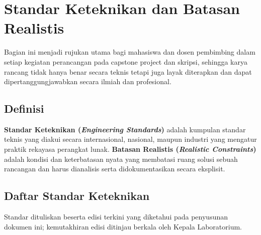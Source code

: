 \documentclass[12pt,a4paper]{report}
\begin{document}
\chapter{Standar Keteknikan dan Batasan Realistis}
\label{chap:standar}

Bagian ini menjadi rujukan utama bagi mahasiswa dan dosen pembimbing dalam setiap kegiatan perancangan pada capstone project dan skripsi, sehingga karya rancang tidak hanya benar secara teknis tetapi juga layak diterapkan dan dapat dipertanggungjawabkan secara il\-mi\-ah dan pro\-fe\-sio\-nal.

\section{Definisi}
\textbf{Standar Keteknikan (\emph{Engineering Standards})} adalah kumpulan standar teknis yang diakui secara internasional, nasional, maupun industri yang mengatur praktik re\-ka\-ya\-sa pe\-rang\-kat lu\-nak. \textbf{Batasan Realistis (\emph{Realistic Constraints})} adalah kondisi dan keterbatasan nyata yang membatasi ruang solusi sebuah rancangan dan harus dianalisis serta didokumentasikan secara eksplisit.

\section{Daftar Standar Keteknikan}
Standar dituliskan beserta edisi terkini yang diketahui pada penyusunan dokumen ini; kemutakhiran edisi ditinjau berkala oleh Kepala Laboratorium.
\end{document}
